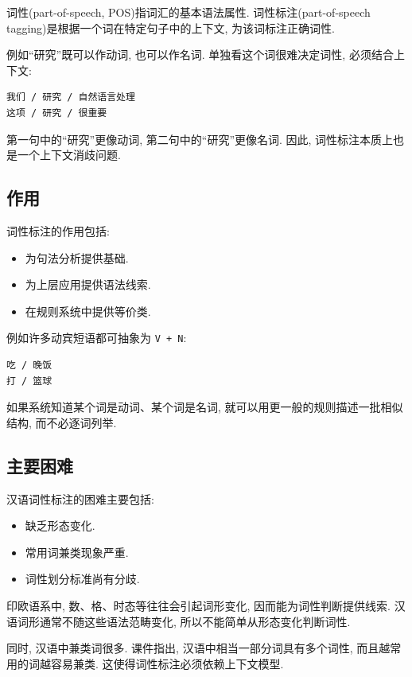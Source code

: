 词性(part-of-speech, POS)指词汇的基本语法属性.
词性标注(part-of-speech tagging)是根据一个词在特定句子中的上下文, 为该词标注正确词性.

例如“研究”既可以作动词, 也可以作名词.
单独看这个词很难决定词性, 必须结合上下文:

\begin{Verbatim}[breaklines=true,breakanywhere=true,fontsize=\small]
我们 / 研究 / 自然语言处理
这项 / 研究 / 很重要
\end{Verbatim}

第一句中的“研究”更像动词, 第二句中的“研究”更像名词.
因此, 词性标注本质上也是一个上下文消歧问题.

\subsection{作用}


词性标注的作用包括:

\begin{itemize}
\item 为句法分析提供基础.
\item 为上层应用提供语法线索.
\item 在规则系统中提供等价类.
\end{itemize}

例如许多动宾短语都可抽象为 \texttt{V + N}:

\begin{Verbatim}[breaklines=true,breakanywhere=true,fontsize=\small]
吃 / 晚饭
打 / 篮球
\end{Verbatim}

如果系统知道某个词是动词、某个词是名词, 就可以用更一般的规则描述一批相似结构, 而不必逐词列举.

\subsection{主要困难}


汉语词性标注的困难主要包括:

\begin{itemize}
\item 缺乏形态变化.
\item 常用词兼类现象严重.
\item 词性划分标准尚有分歧.
\end{itemize}

印欧语系中, 数、格、时态等往往会引起词形变化, 因而能为词性判断提供线索.
汉语词形通常不随这些语法范畴变化, 所以不能简单从形态变化判断词性.

同时, 汉语中兼类词很多.
课件指出, 汉语中相当一部分词具有多个词性, 而且越常用的词越容易兼类.
这使得词性标注必须依赖上下文模型.

